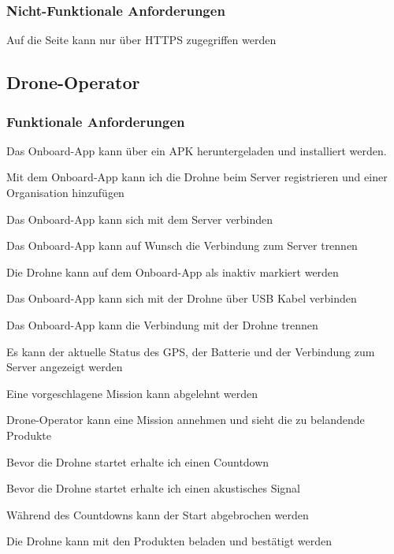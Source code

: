 \subsubsection{Nicht-Funktionale Anforderungen}
\begin{todolist}
	\item Auf die Seite kann nur über HTTPS zugegriffen werden
\end{todolist}

\subsection{Drone-Operator}
\subsubsection{Funktionale Anforderungen}
\begin{todolist}
	\item Das Onboard-App kann über ein APK heruntergeladen und installiert werden.
	\item[\done] Mit dem Onboard-App kann ich die Drohne beim Server registrieren und einer Organisation hinzufügen
	\item[\done] Das Onboard-App kann sich mit dem Server verbinden
	\item Das Onboard-App kann auf Wunsch die Verbindung zum Server trennen
	\item Die Drohne kann auf dem Onboard-App als inaktiv markiert werden
	\item[\done] Das Onboard-App kann sich mit der Drohne über USB Kabel verbinden
	\item[\done] Das Onboard-App kann die Verbindung mit der Drohne trennen
	\item Es kann der aktuelle Status des GPS, der Batterie und der Verbindung zum Server angezeigt werden
	\item Eine vorgeschlagene Mission kann abgelehnt werden
	\item Drone-Operator kann eine Mission annehmen und sieht die zu belandende Produkte
	\item Bevor die Drohne startet erhalte ich einen Countdown
	\item Bevor die Drohne startet erhalte ich einen akustisches Signal
	\item Während des Countdowns kann der Start abgebrochen werden
	\item Die Drohne kann mit den Produkten beladen und bestätigt werden
\end{todolist}

